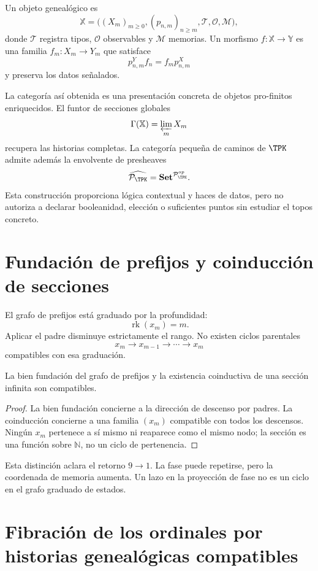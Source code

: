 \begin{definition}
Un objeto genealógico es
\[
  \mathbb X=
  \bigl((X_m)_{m\ge0},(p_{n,m})_{n\ge m},
  \mathcal T,\mathcal O,\mathcal M\bigr),
\]
donde \(\mathcal T\) registra tipos, \(\mathcal O\) observables y
\(\mathcal M\) memorias. Un morfismo
\(f:\mathbb X\to\mathbb Y\) es una familia \(f_m:X_m\to Y_m\) que satisface
\[
  p^Y_{n,m}f_n=f_mp^X_{n,m}
\]
y preserva los datos señalados.
\end{definition}

La categoría así obtenida es una presentación concreta de objetos
pro-finitos enriquecidos. El funtor de secciones globales
\[
  \Gamma(\mathbb X)=\varprojlim_mX_m
\]
recupera las historias completas. La categoría pequeña de caminos de
\(\TPK\) admite además la envolvente de presheaves
\[
  \widehat{\mathcal P_{\TPK}}
  =
  \mathbf{Set}^{\mathcal P_{\TPK}^{op}}.
\]
Esta construcción proporciona lógica contextual y haces de datos, pero no
autoriza a declarar booleanidad, elección o suficientes puntos sin estudiar
el topos concreto.

\section{Fundación de prefijos y coinducción de secciones}

El grafo de prefijos está graduado por la profundidad:
\[
  \operatorname{rk}(x_m)=m.
\]
Aplicar el padre disminuye estrictamente el rango. No existen ciclos
parentales
\[
  x_m\to x_{m-1}\to\cdots\to x_m
\]
compatibles con esa graduación.

\begin{proposition}
La bien fundación del grafo de prefijos y la existencia coinductiva de una
sección infinita son compatibles.
\end{proposition}

\begin{proof}
La bien fundación concierne a la dirección de descenso por padres. La
coinducción concierne a una familia \((x_m)\) compatible con todos los
descensos. Ningún \(x_m\) pertenece a sí mismo ni reaparece como el mismo
nodo; la sección es una función sobre \(\mathbb N\), no un ciclo de
pertenencia.
\end{proof}

Esta distinción aclara el retorno \(9\to1\). La fase puede repetirse, pero
la coordenada de memoria aumenta. Un lazo en la proyección de fase no es un
ciclo en el grafo graduado de estados.

\section{Fibración de los ordinales por historias genealógicas compatibles}


